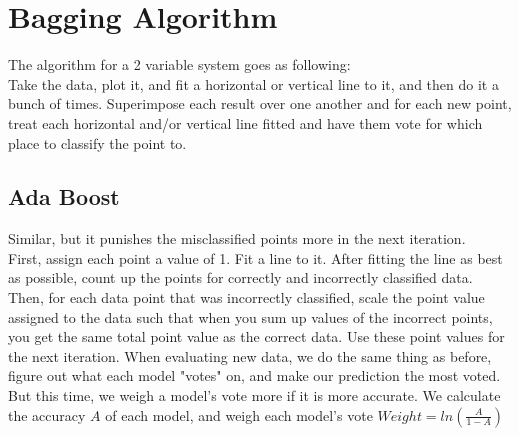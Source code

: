 \documentclass{article}
\begin{document}
\section{Bagging Algorithm}
The algorithm for a 2 variable system goes as following:\\
Take the data, plot it, and fit a horizontal or vertical line to it, and then do it a bunch of times. Superimpose each result over one another and for each new point, treat each horizontal and/or vertical line fitted and have them vote for which place to classify the point to. 
\subsection{Ada Boost}
Similar, but it punishes the misclassified points more in the next iteration.\\
First, assign each point a value of 1. Fit a line to it. After fitting the line as best as possible, count up the points for correctly and incorrectly classified data. Then, for each data point that was incorrectly classified, scale the point value assigned to the data such that when you sum up values of the incorrect points, you get the same total point value as the correct data. Use these point values for the next iteration. When evaluating new data, we do the same thing as before, figure out what each model "votes" on, and make our prediction the most voted. But this time, we weigh a model's vote more if it is more accurate. We calculate the accuracy $A$ of each model, and weigh each model's vote $Weight = ln(\frac{A}{1-A})$
\end{document}
